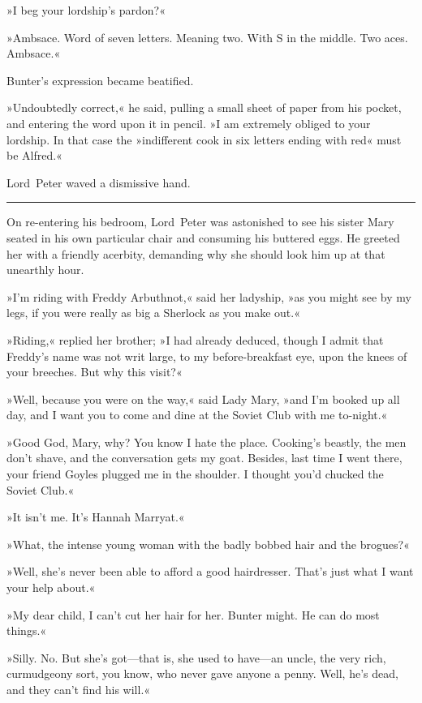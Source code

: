 »I beg your lordship's pardon?«

»Ambsace. Word of seven letters. Meaning two. With S in the middle. Two aces. Ambsace.«

Bunter's expression became beatified.

»Undoubtedly correct,« he said, pulling a small sheet of paper from his pocket, and entering the word upon it in pencil. »I am extremely obliged to your lordship. In that case the »indifferent cook in six letters ending with red« must be Alfred.«

Lord~Peter waved a dismissive hand.

\noindent\hfil\rule{0.5\textwidth}{.4pt}\hfil 

On re-entering his bedroom, Lord~Peter was astonished to see his sister Mary seated in his own particular chair and consuming his buttered eggs. He greeted her with a friendly acerbity, demanding why she should look him up at that unearthly hour.

»I'm riding with Freddy Arbuthnot,« said her ladyship, »as you might see by my legs, if you were really as big a Sherlock as you make out.«

»Riding,« replied her brother; »I had already deduced, though I admit that Freddy's name was not writ large, to my before-breakfast eye, upon the knees of your breeches. But why this visit?«

»Well, because you were on the way,« said Lady Mary, »and I'm booked up all day, and I want you to come and dine at the Soviet Club with me to-night.«

»Good God, Mary, why? You know I hate the place. Cooking's beastly, the men don't shave, and the conversation gets my goat. Besides, last time I went there, your friend Goyles plugged me in the shoulder. I thought you'd chucked the Soviet Club.«

»It isn't me. It's Hannah Marryat.«

»What, the intense young woman with the badly bobbed hair and the brogues?«

»Well, she's never been able to afford a good hairdresser. That's just what I want your help about.«

»My dear child, I can't cut her hair for her. Bunter might. He can do most things.«

»Silly. No. But she's got—that is, she used to have—an uncle, the very rich, curmudgeony sort, you know, who never gave anyone a penny. Well, he's dead, and they can't find his will.«

